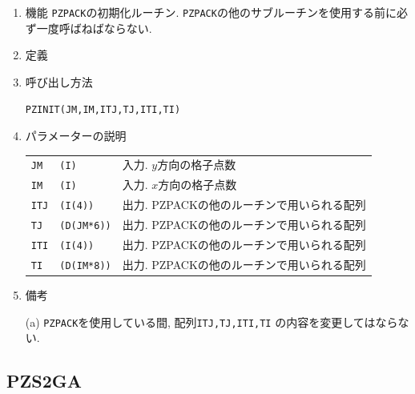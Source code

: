 \documentclass[a4j,fleqn]{jarticle}
\begin{document}
\begin{enumerate}

\item 機能 
{\tt PZPACK}の初期化ルーチン. 
{\tt PZPACK}の他のサブルーチンを使用する前に必ず一度呼ばねばならない.

\item 定義

\item 呼び出し方法 
    
{\tt PZINIT(JM,IM,ITJ,TJ,ITI,TI)}
  
\item パラメーターの説明 
    
\begin{tabular}{lll}
{\tt JM} & {\tt (I)} & 入力. $y$方向の格子点数\\
{\tt IM} & {\tt (I)} & 入力. $x$方向の格子点数\\
{\tt ITJ}  & {\tt (I(4))}    & 出力. PZPACKの他のルーチンで用いられる配列\\
{\tt TJ}   & {\tt (D(JM*6))} & 出力. PZPACKの他のルーチンで用いられる配列\\
{\tt ITI}  & {\tt (I(4))}    & 出力. PZPACKの他のルーチンで用いられる配列\\
{\tt TI}   & {\tt (D(IM*8))} & 出力. PZPACKの他のルーチンで用いられる配列
\end{tabular}

\item 備考

(a) {\tt PZPACK}を使用している間, 配列{\tt ITJ,TJ,ITI,TI}
の内容を変更してはならない.

\end{enumerate}


\subsection{PZS2GA}
\end{document}
